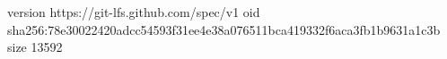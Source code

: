 version https://git-lfs.github.com/spec/v1
oid sha256:78e30022420adcc54593f31ee4e38a076511bca419332f6aca3fb1b9631a1c3b
size 13592
